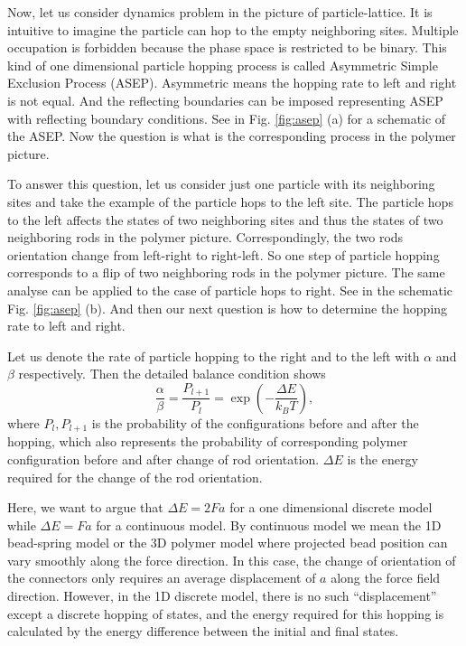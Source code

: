 Now, let us consider dynamics problem in the picture of particle-lattice. It is intuitive to imagine the particle can hop to the empty neighboring sites. Multiple occupation is forbidden because the phase space is restricted to be binary. This kind of one dimensional particle hopping process is called Asymmetric Simple Exclusion Process (ASEP). Asymmetric means the hopping rate to left and right is not equal. And the reflecting boundaries can be imposed representing ASEP with reflecting boundary conditions. See in Fig. \ref{fig:asep} (a) for a schematic of the ASEP. Now the question is what is the corresponding process in the polymer picture. 

To answer this question, let us consider just one particle with its neighboring sites and take the example of the particle hops to the left site. The particle hops to the left affects the states of two neighboring sites and thus the states of two neighboring rods in the polymer picture. Correspondingly, the two rods orientation change from left-right to right-left. So one step of particle hopping corresponds to a flip of two neighboring rods in the polymer picture. The same analyse can be applied to the case of particle hops to right. See in the schematic Fig. \ref{fig:asep} (b). And then our next question is how to determine the hopping rate to left and right. 

Let us denote the rate of particle hopping to the right and to the left with $\alpha$ and $\beta$ respectively. Then the detailed balance condition shows
\begin{equation}
    \label{eq:detailedBalance}
    \frac{\alpha}{\beta} = \frac{P_{l+1}}{P_{l}} = \exp\left(-\frac{\Delta E}{k_B T}\right),
\end{equation}
where $P_l,P_{l+1}$ is the probability of the configurations before and after the hopping, which also represents the probability of corresponding polymer configuration before and after change of rod orientation. $\Delta E$ is the energy required for the change of the rod orientation. 

Here, we want to argue that $\Delta E = 2Fa$ for a one dimensional discrete model while $\Delta E = Fa$ for a continuous model. By continuous model we mean the 1D bead-spring model or the 3D polymer model where projected bead position can vary smoothly along the force direction. 
In this case, the change of orientation of the connectors only requires an average displacement of $a$ along the force field direction. However, in the 1D discrete model, there is no such ``displacement'' except a discrete hopping of states, and the energy required for this hopping is calculated by the energy difference between the initial and final states.

